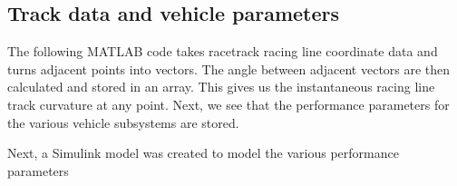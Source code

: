 \documentclass{article}
\begin{document}
\subsection{Track data and vehicle parameters}
The following MATLAB code takes racetrack racing line coordinate data and turns adjacent points into vectors. The angle between adjacent vectors are then calculated and stored in an array. This gives us the instantaneous racing line track curvature at any point. Next, we see that the performance parameters for the various vehicle subsystems are stored. 

Next, a Simulink model was created to model the various performance parameters



\end{document}
